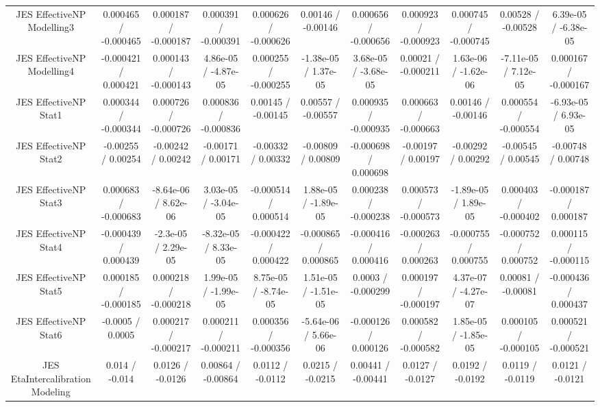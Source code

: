 \begin{table}[htbp]
\begin{center}
\begin{tabular}{|c|c|c|c|c|c|c|c|c|c|c|}
  JES EffectiveNP Modelling3 & 0.000465 / -0.000465 & 0.000187 / -0.000187 & 0.000391 / -0.000391 & 0.000626 / -0.000626 & 0.00146 / -0.00146 & 0.000656 / -0.000656 & 0.000923 / -0.000923 & 0.000745 / -0.000745 & 0.00528 / -0.00528 & 6.39e-05 / -6.38e-05 \\ 
  JES EffectiveNP Modelling4 & -0.000421 / 0.000421 & 0.000143 / -0.000143 & 4.86e-05 / -4.87e-05 & 0.000255 / -0.000255 & -1.38e-05 / 1.37e-05 & 3.68e-05 / -3.68e-05 & 0.00021 / -0.000211 & 1.63e-06 / -1.62e-06 & -7.11e-05 / 7.12e-05 & 0.000167 / -0.000167 \\ 
  JES EffectiveNP Stat1 & 0.000344 / -0.000344 & 0.000726 / -0.000726 & 0.000836 / -0.000836 & 0.00145 / -0.00145 & 0.00557 / -0.00557 & 0.000935 / -0.000935 & 0.000663 / -0.000663 & 0.00146 / -0.00146 & 0.000554 / -0.000554 & -6.93e-05 / 6.93e-05 \\ 
  JES EffectiveNP Stat2 & -0.00255 / 0.00254 & -0.00242 / 0.00242 & -0.00171 / 0.00171 & -0.00332 / 0.00332 & -0.00809 / 0.00809 & -0.000698 / 0.000698 & -0.00197 / 0.00197 & -0.00292 / 0.00292 & -0.00545 / 0.00545 & -0.00748 / 0.00748 \\ 
  JES EffectiveNP Stat3 & 0.000683 / -0.000683 & -8.64e-06 / 8.62e-06 & 3.03e-05 / -3.04e-05 & -0.000514 / 0.000514 & 1.88e-05 / -1.89e-05 & 0.000238 / -0.000238 & 0.000573 / -0.000573 & -1.89e-05 / 1.89e-05 & 0.000403 / -0.000402 & -0.000187 / 0.000187 \\ 
  JES EffectiveNP Stat4 & -0.000439 / 0.000439 & -2.3e-05 / 2.29e-05 & -8.32e-05 / 8.33e-05 & -0.000422 / 0.000422 & -0.000865 / 0.000865 & -0.000416 / 0.000416 & -0.000263 / 0.000263 & -0.000755 / 0.000755 & -0.000752 / 0.000752 & 0.000115 / -0.000115 \\ 
  JES EffectiveNP Stat5 & 0.000185 / -0.000185 & 0.000218 / -0.000218 & 1.99e-05 / -1.99e-05 & 8.75e-05 / -8.74e-05 & 1.51e-05 / -1.51e-05 & 0.0003 / -0.000299 & 0.000197 / -0.000197 & 4.37e-07 / -4.27e-07 & 0.00081 / -0.00081 & -0.000436 / 0.000437 \\ 
  JES EffectiveNP Stat6 & -0.0005 / 0.0005 & 0.000217 / -0.000217 & 0.000211 / -0.000211 & 0.000356 / -0.000356 & -5.64e-06 / 5.66e-06 & -0.000126 / 0.000126 & 0.000582 / -0.000582 & 1.85e-05 / -1.85e-05 & 0.000105 / -0.000105 & 0.000521 / -0.000521 \\ 
  JES EtaIntercalibration Modeling & 0.014 / -0.014 & 0.0126 / -0.0126 & 0.00864 / -0.00864 & 0.0112 / -0.0112 & 0.0215 / -0.0215 & 0.00441 / -0.00441 & 0.0127 / -0.0127 & 0.0192 / -0.0192 & 0.0119 / -0.0119 & 0.0121 / -0.0121 \\ 

\end{tabular}
\end{center}
\end{table}
